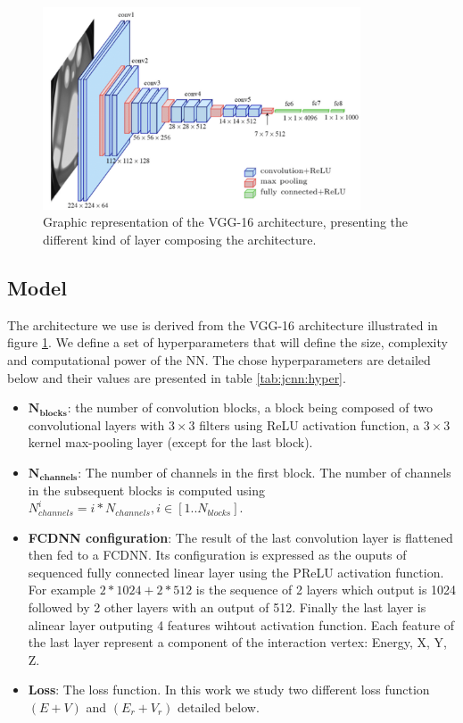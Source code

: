 \documentclass[../main.tex]{subfiles}
\begin{document}
\begin{figure}[ht]
  \centering
  \includegraphics[height=6cm]{images/jcnn/vgg16.png}
  \caption{Graphic representation of the VGG-16 architecture, presenting the different kind of layer composing the architecture.}
  \label{fig:jcnn:vgg16}
\end{figure}

\subsection{Model}
\label{sec:jcnn:model}

The architecture we use is derived from the VGG-16 architecture \cite{simonyan_very_2015} illustrated in figure \ref{fig:jcnn:vgg16}. We define a set of hyperparameters that will define the size, complexity and computational power of the NN. The chose hyperparameters are detailed below and their values are presented in table \ref{tab:jcnn:hyper}.
\begin{itemize}
  \item $\mathbf{N_{blocks}}$: the number of convolution blocks, a block being composed of two convolutional layers with $3\times3$ filters using ReLU activation function, a $3\times3$ kernel max-pooling layer  (except for the last block).
  \item $\mathbf{N_{channels}}$: The number of channels in the first block. The number of channels in the subsequent blocks is computed using $N^i_{channels} = i * N_{channels}, i \in [1..N_{blocks}]$.
  \item \textbf{FCDNN configuration}: The result of the last convolution layer is flattened then fed to a FCDNN. Its configuration is expressed as the ouputs of sequenced fully connected linear layer using the PReLU activation function. For example $2 * 1024 + 2 * 512$ is the sequence of 2 layers which output is 1024 followed by 2 other layers with an output of 512. Finally the last layer is alinear layer outputing 4 features wihtout activation function. Each feature of the last layer represent a component of the interaction vertex: Energy, X, Y, Z.
  \item \textbf{Loss}: The loss function. In this work we study two different loss function $(E+V)$ and $(E_r + V_r)$ detailed below.
\end{itemize}
\end{document}
